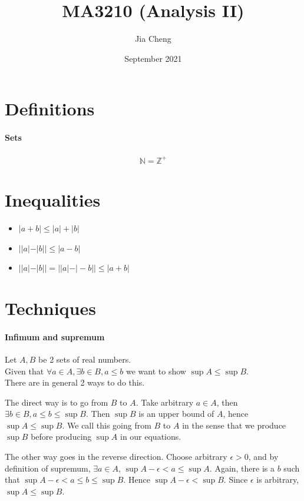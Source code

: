 \documentclass{article}
\title{MA3210 (Analysis II)}
\author{Jia Cheng}
\date{September 2021}
\begin{document}
\maketitle

\section{Definitions}
\paragraph{Sets}
\begin{align*}
	\mathbb{N}=\mathbb{Z}^+
\end{align*}

\section{Inequalities}
\begin{itemize}
	\item $|a + b| \leq |a| + |b|$
	\item $||a| - |b||\leq |a - b|$
	\item $||a| - |b|| = ||a| - |-b|| \leq |a + b|$
\end{itemize}

\section{Techniques}
\paragraph{Infimum and supremum}
Let $A, B$ be 2 sets of real numbers.\\
Given that $\forall a\in A, \exists b\in B, a\leq b$ we want to show $\sup A \leq \sup B$.\\
There are in general 2 ways to do this.

The direct way is to go from $B$ to $A$. Take arbitrary $a\in A$, then $\exists b\in B, a\leq b\leq \sup B$. Then $\sup B$ is an upper bound of $A$, hence $\sup A\leq \sup B$. We call this going from $B$ to $A$ in the sense that we produce $\sup B$ before producing $\sup A$ in our equations.

The other way goes in the reverse direction. Choose arbitrary $\epsilon>0$, and by definition of supremum, $\exists a\in A$, $\sup A - \epsilon<a\leq \sup A$. Again, there is a $b$ such that $\sup A-\epsilon < a\leq b\leq \sup B$. Hence $\sup A-\epsilon < \sup B$. Since $\epsilon$ is arbitrary, $\sup A\leq \sup B$.
\end{document}
